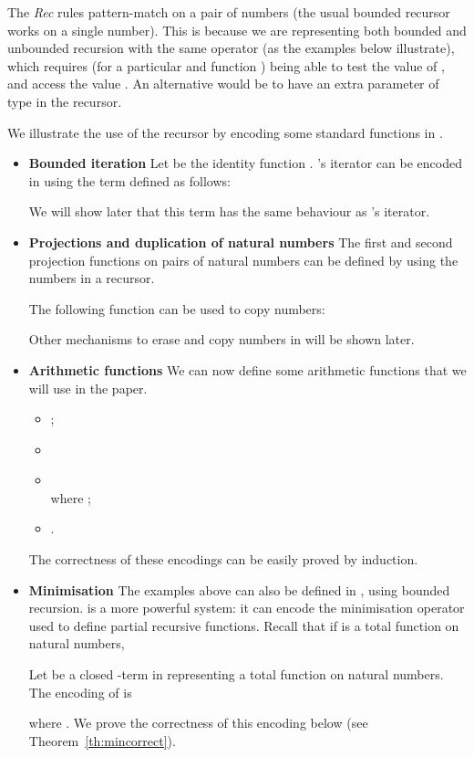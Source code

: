 \documentclass{article}
\begin{document}
The \emph{Rec} rules pattern-match on a pair of numbers (the usual
bounded recursor works on a single number). This is because we are
representing both bounded and unbounded recursion with the same
operator (as the examples below illustrate), which requires (for a
particular  and function ) being able to test the value of
, and access the value .  An alternative would be to have an
extra parameter of type  in the recursor.

\begin{example}\label{sec:Lrecex}
We illustrate the use of the recursor by encoding some standard functions in \LLCIrec.
\begin{itemize}
\item \textbf{Bounded iteration}
  Let  be the
identity function . \LLCI's iterator can be encoded in  using
the term   defined as follows:

We will show later that this term  has the same behaviour
as \LLCI's iterator.

\item  \textbf{Projections and duplication of natural numbers}
The first and second projection functions on pairs  of
natural numbers can be defined  by using the numbers in a recursor.

The following function  can be used to copy numbers:

Other
mechanisms to erase and copy numbers in  will be shown later.

\item  \textbf{Arithmetic functions}
We can now define some arithmetic functions that we will use in the paper.
\begin{itemize}
\item ;
\item 
\item \\
where ;
\item .
\end{itemize}
The correctness of these encodings can be easily proved by induction.

\item  \textbf{Minimisation}
\label{ex:min}
The examples above can also be defined in \LLCI, using bounded
recursion.  is a more powerful system:  it can encode the
minimisation operator  used to define partial recursive
functions.  Recall that if  is a total
function on natural numbers, 

Let  be a closed -term  in  
representing a total function  on natural numbers. The encoding of  is
 
where .  We 
prove the correctness of this encoding below (see Theorem~\ref{th:mincorrect}).
\end{itemize}
\end{example}
\end{document}

